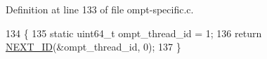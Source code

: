 Definition at line 133 of file ompt-\/specific.\-c.


\begin{DoxyCode}
134 \{
135     \textcolor{keyword}{static} uint64\_t ompt\_thread\_id = 1;
136     \textcolor{keywordflow}{return} \hyperlink{ompt-specific_8c_acb567df2f081ca57ef1be6e2adb72512}{NEXT\_ID}(&ompt\_thread\_id, 0);
137 \}
\end{DoxyCode}
